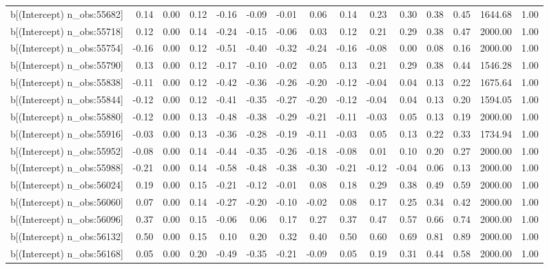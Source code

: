 \begin{table}[ht]
\begin{tabular}{rrrrrrrrrrrrrrr}
  b[(Intercept) n\_obs:55682] & 0.14 & 0.00 & 0.12 & -0.16 & -0.09 & -0.01 & 0.06 & 0.14 & 0.23 & 0.30 & 0.38 & 0.45 & 1644.68 & 1.00 \\ 
  b[(Intercept) n\_obs:55718] & 0.12 & 0.00 & 0.14 & -0.24 & -0.15 & -0.06 & 0.03 & 0.12 & 0.21 & 0.29 & 0.38 & 0.47 & 2000.00 & 1.00 \\ 
  b[(Intercept) n\_obs:55754] & -0.16 & 0.00 & 0.12 & -0.51 & -0.40 & -0.32 & -0.24 & -0.16 & -0.08 & 0.00 & 0.08 & 0.16 & 2000.00 & 1.00 \\ 
  b[(Intercept) n\_obs:55790] & 0.13 & 0.00 & 0.12 & -0.17 & -0.10 & -0.02 & 0.05 & 0.13 & 0.21 & 0.29 & 0.38 & 0.44 & 1546.28 & 1.00 \\ 
  b[(Intercept) n\_obs:55838] & -0.11 & 0.00 & 0.12 & -0.42 & -0.36 & -0.26 & -0.20 & -0.12 & -0.04 & 0.04 & 0.13 & 0.22 & 1675.64 & 1.00 \\ 
  b[(Intercept) n\_obs:55844] & -0.12 & 0.00 & 0.12 & -0.41 & -0.35 & -0.27 & -0.20 & -0.12 & -0.04 & 0.04 & 0.13 & 0.20 & 1594.05 & 1.00 \\ 
  b[(Intercept) n\_obs:55880] & -0.12 & 0.00 & 0.13 & -0.48 & -0.38 & -0.29 & -0.21 & -0.11 & -0.03 & 0.05 & 0.13 & 0.19 & 2000.00 & 1.00 \\ 
  b[(Intercept) n\_obs:55916] & -0.03 & 0.00 & 0.13 & -0.36 & -0.28 & -0.19 & -0.11 & -0.03 & 0.05 & 0.13 & 0.22 & 0.33 & 1734.94 & 1.00 \\ 
  b[(Intercept) n\_obs:55952] & -0.08 & 0.00 & 0.14 & -0.44 & -0.35 & -0.26 & -0.18 & -0.08 & 0.01 & 0.10 & 0.20 & 0.27 & 2000.00 & 1.00 \\ 
  b[(Intercept) n\_obs:55988] & -0.21 & 0.00 & 0.14 & -0.58 & -0.48 & -0.38 & -0.30 & -0.21 & -0.12 & -0.04 & 0.06 & 0.13 & 2000.00 & 1.00 \\ 
  b[(Intercept) n\_obs:56024] & 0.19 & 0.00 & 0.15 & -0.21 & -0.12 & -0.01 & 0.08 & 0.18 & 0.29 & 0.38 & 0.49 & 0.59 & 2000.00 & 1.00 \\ 
  b[(Intercept) n\_obs:56060] & 0.07 & 0.00 & 0.14 & -0.27 & -0.20 & -0.10 & -0.02 & 0.08 & 0.17 & 0.25 & 0.34 & 0.42 & 2000.00 & 1.00 \\ 
  b[(Intercept) n\_obs:56096] & 0.37 & 0.00 & 0.15 & -0.06 & 0.06 & 0.17 & 0.27 & 0.37 & 0.47 & 0.57 & 0.66 & 0.74 & 2000.00 & 1.00 \\ 
  b[(Intercept) n\_obs:56132] & 0.50 & 0.00 & 0.15 & 0.10 & 0.20 & 0.32 & 0.40 & 0.50 & 0.60 & 0.69 & 0.81 & 0.89 & 2000.00 & 1.00 \\ 
  b[(Intercept) n\_obs:56168] & 0.05 & 0.00 & 0.20 & -0.49 & -0.35 & -0.21 & -0.09 & 0.05 & 0.19 & 0.31 & 0.44 & 0.58 & 2000.00 & 1.00 \\ 

\end{tabular}
\end{table}
